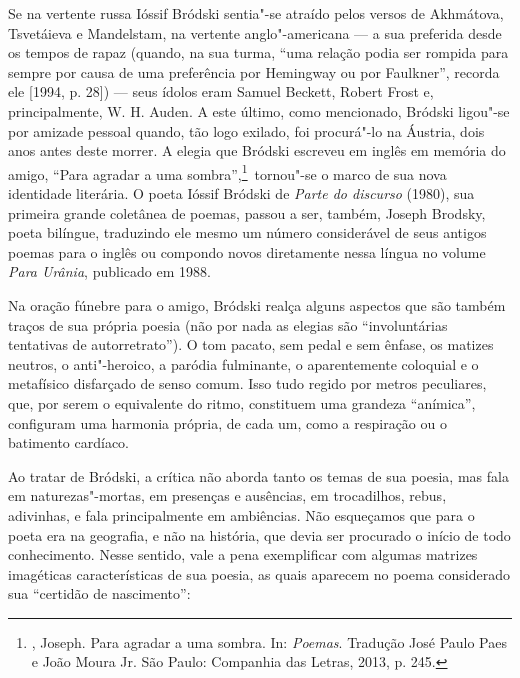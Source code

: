 {Se na vertente russa Ióssif Bródski sentia"-se atraído pelos versos de
Akhmátova, Tsvetáieva e Mandelstam, na vertente anglo"-americana --- a sua
preferida desde os tempos de rapaz (quando, na sua turma,
``uma relação podia ser rompida para sempre por causa de uma preferência
por Hemingway ou por Faulkner'', recorda ele [1994, p. 28]) --- seus ídolos eram Samuel
Beckett, Robert Frost e, principalmente, W. H. Auden. A este último, como mencionado, Bródski
ligou"-se por amizade pessoal quando, tão logo exilado, foi procurá"-lo
na Áustria, dois anos antes deste morrer. A
elegia que Bródski escreveu em inglês em memória do amigo, ``Para
agradar a uma sombra'',\footnote{, Joseph. Para agradar a uma sombra.
 In:  \emph{Poemas}. Tradução José Paulo Paes e 
João Moura Jr. São Paulo: Companhia das Letras, 2013, p. 245.}\ tornou"-se o marco de sua nova identidade
literária. O poeta Ióssif Bródski de \emph{Parte do discurso} (1980), sua primeira grande coletânea de poemas, passou a ser,
também, Joseph Brodsky, poeta bilíngue, traduzindo ele mesmo um
número considerável de seus antigos poemas para o inglês ou compondo
novos diretamente nessa língua no volume \emph{Para Urânia},
publicado em 1988.

Na oração fúnebre para o amigo, Bródski realça alguns
aspectos que são também traços de sua própria poesia (não por nada as elegias são
``involuntárias tentativas de autorretrato''). O tom pacato,
sem pedal e sem ênfase, os matizes neutros, o anti"-heroico, a paródia
fulminante, o aparentemente coloquial e o metafísico disfarçado de senso
comum. Isso tudo regido por metros peculiares, que, por serem o
equivalente do ritmo, constituem uma grandeza ``anímica'', configuram uma
harmonia própria, de cada um, como a respiração ou o batimento cardíaco.

Ao tratar de Bródski, a crítica não aborda tanto os temas de sua poesia, mas
fala em naturezas"-mortas, em presenças e ausências, em trocadilhos, rebus, adivinhas, e fala
principalmente em ambiências. Não esqueçamos que para o poeta era na
geografia, e não na história, que devia ser procurado o início de todo
conhecimento. Nesse sentido, vale a pena exemplificar com algumas
matrizes imagéticas características de sua poesia, as quais aparecem no poema
considerado sua ``certidão de nascimento'':

}
